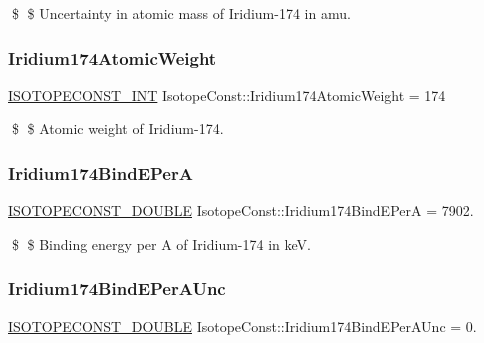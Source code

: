 \$ \$ Uncertainty in atomic mass of Iridium-\/174 in amu. \mbox{\label{group___isotope_const-_iridium-_ir174_gaf006febf72c8dbadf67f1e8b754430d8}} 
\subsubsection{\texorpdfstring{Iridium174\+Atomic\+Weight}{Iridium174AtomicWeight}}
{\footnotesize\ttfamily \mbox{\hyperlink{group___isotope_const-_macros_ga5f18360b3e99483a35c32d789e62621c}{I\+S\+O\+T\+O\+P\+E\+C\+O\+N\+S\+T\+\_\+\+I\+NT}} Isotope\+Const\+::\+Iridium174\+Atomic\+Weight = 174}

\$ \$ Atomic weight of Iridium-\/174. \mbox{\label{group___isotope_const-_iridium-_ir174_ga72ead0663a9437d121e58497b56040d4}} 
\subsubsection{\texorpdfstring{Iridium174\+Bind\+E\+PerA}{Iridium174BindEPerA}}
{\footnotesize\ttfamily \mbox{\hyperlink{group___isotope_const-_macros_ga8f45a7272ce02c0b4c65c44636ed719a}{I\+S\+O\+T\+O\+P\+E\+C\+O\+N\+S\+T\+\_\+\+D\+O\+U\+B\+LE}} Isotope\+Const\+::\+Iridium174\+Bind\+E\+PerA = 7902.}

\$ \$ Binding energy per A of Iridium-\/174 in keV. \mbox{\label{group___isotope_const-_iridium-_ir174_gaf10a26ae87b15de7b18d97e387661a86}} 
\subsubsection{\texorpdfstring{Iridium174\+Bind\+E\+Per\+A\+Unc}{Iridium174BindEPerAUnc}}
{\footnotesize\ttfamily \mbox{\hyperlink{group___isotope_const-_macros_ga8f45a7272ce02c0b4c65c44636ed719a}{I\+S\+O\+T\+O\+P\+E\+C\+O\+N\+S\+T\+\_\+\+D\+O\+U\+B\+LE}} Isotope\+Const\+::\+Iridium174\+Bind\+E\+Per\+A\+Unc = 0.}


